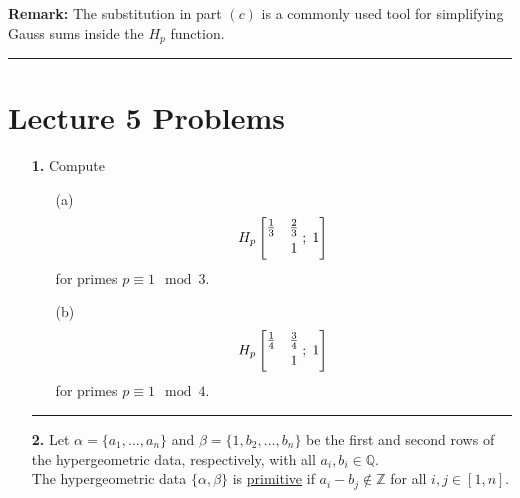 \documentclass[12pt]{amsart}
\theoremstyle{definition}
\theoremstyle{remark}
\numberwithin{equation}{section}
\def\Z{{\mathbb Z}}
\def\Q{{\mathbb Q}}
\def\Z{\mathbb{Z}}
\def\Q{\mathbb{Q}}
\begin{document}
\begin{itemize}
\textbf{Remark:} The substitution in part $(c)$ is a commonly used tool for simplifying Gauss sums inside the $H_{p}$ function.

\vspace{8mm}

\hrule{}

\vspace{8mm}

\section*{Lecture 5 Problems}

\begin{itemize}
\item[\textbf{1.}] Compute 
\vspace{5mm}

\begin{itemize}

\item[(a)] $$H_{p}\left[\begin{matrix} \frac{1}{3} & \frac{2}{3} \smallskip \\   & 1 \end{matrix} \; ; \; 1 \right]$$ for primes $p \equiv 1 \mod 3$.
    \vspace{5mm}

    \vspace{5mm}

\item[(b)] $$H_{p}\left[\begin{matrix} \frac{1}{4} & \frac{3}{4} \smallskip \\   & 1 \end{matrix} \; ; \; 1 \right]$$ for primes $p \equiv 1 \mod 4$.
\end{itemize}

\vspace{8mm}

\hrule{}

\vspace{4mm}

\item[\textbf{2.}] Let $\alpha = \{a_{1}, \ldots, a_{n}\}$ and $\beta = \{1,b_{2}, \ldots, b_{n}\}$ be the first and second rows of the hypergeometric data, respectively, with all $a_{i}, b_{i} \in \Q$.
\\

The hypergeometric data $\{\alpha, \beta\}$ is \underline{primitive} if $a_{i}-b_{j} \notin \Z$ for all $i,j \in [1,n]$. 

\vspace{4mm}


\end{itemize}
\end{itemize}
\end{document}
